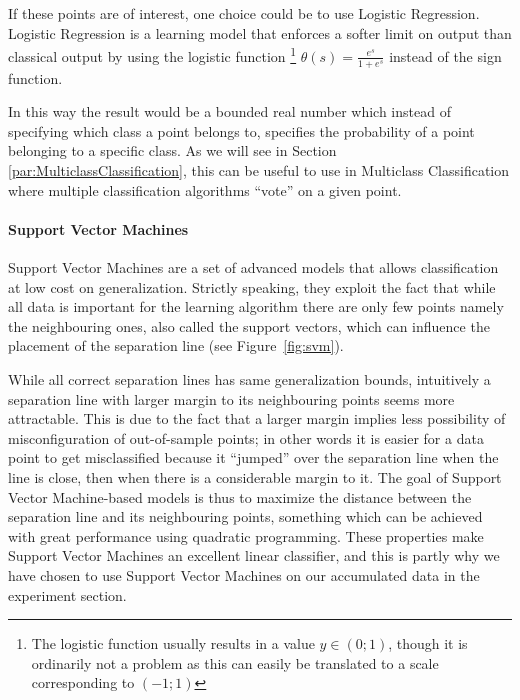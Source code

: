 If these points are of interest, one choice could be to use Logistic Regression.
Logistic Regression is a learning model that enforces a softer limit on output than classical output by using the logistic function
\footnote{The logistic function usually results in a value $y \in \left(0;1\right)$, though it is ordinarily not a problem as
this can easily be translated to a scale corresponding to $\left(-1;1\right)$}
$\theta(s) = \frac{e^s}{1+e^s}$ instead of the sign function.

In this way the result would be a bounded real number which instead of specifying which class a point belongs to, specifies the probability of a point belonging to a specific class.
As we will see in Section \ref{par:MulticlassClassification}, this can be useful to use in Multiclass Classification where multiple classification algorithms ``vote'' on a given point.
\paragraph{Support Vector Machines}
\label{par:SupportVectorMachines}

Support Vector Machines are a set of advanced models that allows classification at low cost on generalization.
Strictly speaking, they exploit the fact that while all data is important for the learning algorithm there 
are only few points namely the neighbouring ones, also called the support vectors, which can influence the placement of the separation line (see Figure~\ref{fig:svm}).

\begin{minipage}{\linewidth}
\centering
{}
\label{fig:svm}
\end{minipage}

While all correct separation lines has same generalization bounds, intuitively a separation line with larger margin to its neighbouring points seems more attractable.
This is due to the fact that a larger margin implies less possibility of misconfiguration of out-of-sample points; in other words it is easier for a data point to get
misclassified because it ``jumped'' over the separation line when the line is close, then when there is a considerable margin to it.
The goal of Support Vector Machine-based models is thus to maximize the distance between the separation line and its neighbouring points,
something which can be achieved with great performance using quadratic programming\cite{learningfromdata2012course}\cite{frank2006algorithm}. 
These properties make Support Vector Machines an excellent linear classifier, and this is 
partly why we have chosen to use Support Vector Machines on our accumulated data in the experiment section.

